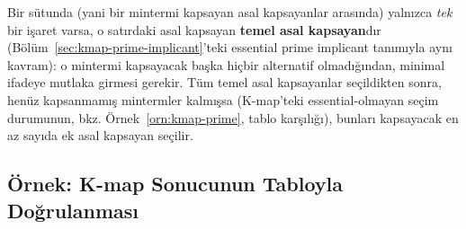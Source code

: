 Bir sütunda (yani bir mintermi kapsayan asal kapsayanlar arasında) yalnızca \emph{tek}
bir işaret varsa, o satırdaki asal kapsayan \textbf{temel asal kapsayan}dır
(Bölüm~\ref{sec:kmap-prime-implicant}'teki essential prime implicant tanımıyla aynı
kavram): o mintermi kapsayacak başka hiçbir alternatif olmadığından, minimal ifadeye
mutlaka girmesi gerekir. Tüm temel asal kapsayanlar seçildikten sonra, henüz kapsanmamış
mintermler kalmışsa (K-map'teki essential-olmayan seçim durumunun, bkz.
Örnek~\ref{orn:kmap-prime}, tablo karşılığı), bunları kapsayacak en az sayıda ek asal
kapsayan seçilir.

\subsection{Örnek: K-map Sonucunun Tabloyla Doğrulanması}\label{sec:qm-ornek}

